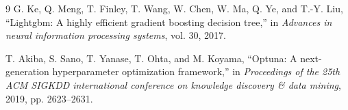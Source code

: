 \documentclass[twoside,twocolumn,10pt]{article}
\begin{document}
\begin{thebibliography}{9}
G. Ke, Q. Meng, T. Finley, T. Wang, W. Chen, W. Ma, Q. Ye, and T.-Y. Liu, ``Lightgbm: A highly efficient gradient boosting decision tree,'' in \emph{Advances in neural information processing systems}, vol. 30, 2017.

T. Akiba, S. Sano, T. Yanase, T. Ohta, and M. Koyama, ``Optuna: A next-generation hyperparameter optimization framework,'' in \emph{Proceedings of the 25th ACM SIGKDD international conference on knowledge discovery \& data mining}, 2019, pp. 2623--2631.

\end{thebibliography}
\end{document}
